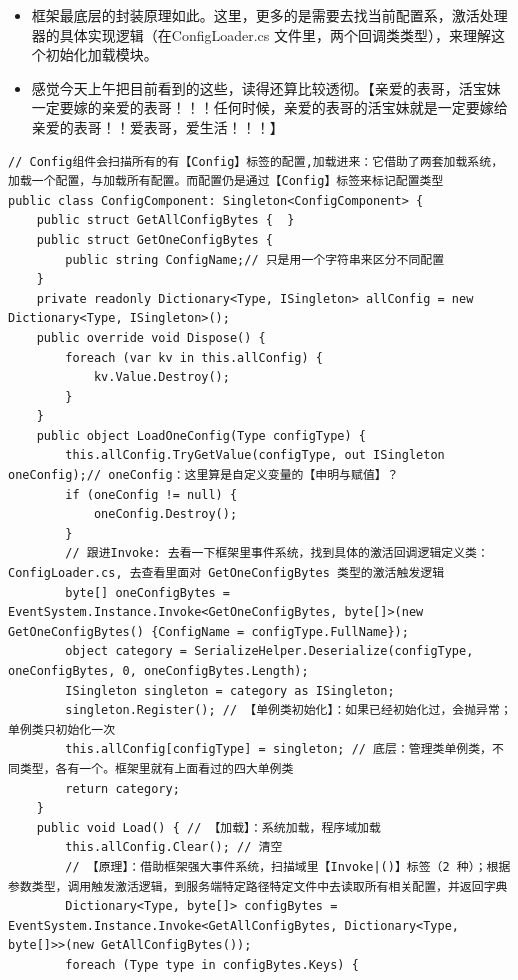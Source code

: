 \documentclass[9pt, b5paper]{article}
\begin{document}
\begin{itemize}
\item 框架最底层的封装原理如此。这里，更多的是需要去找当前配置系，激活处理器的具体实现逻辑（在ConfigLoader.cs 文件里，两个回调类类型），来理解这个初始化加载模块。
\item 感觉今天上午把目前看到的这些，读得还算比较透彻。【亲爱的表哥，活宝妹一定要嫁的亲爱的表哥！！！任何时候，亲爱的表哥的活宝妹就是一定要嫁给亲爱的表哥！！爱表哥，爱生活！！！】
\end{itemize}
\begin{verbatim}
// Config组件会扫描所有的有【Config】标签的配置,加载进来：它借助了两套加载系统，加载一个配置，与加载所有配置。而配置仍是通过【Config】标签来标记配置类型
public class ConfigComponent: Singleton<ConfigComponent> {
    public struct GetAllConfigBytes {  }
    public struct GetOneConfigBytes {
        public string ConfigName;// 只是用一个字符串来区分不同配置 
    }
    private readonly Dictionary<Type, ISingleton> allConfig = new Dictionary<Type, ISingleton>();
    public override void Dispose() {
        foreach (var kv in this.allConfig) {
            kv.Value.Destroy();
        }
    }
    public object LoadOneConfig(Type configType) {
        this.allConfig.TryGetValue(configType, out ISingleton oneConfig);// oneConfig：这里算是自定义变量的【申明与赋值】？
        if (oneConfig != null) {
            oneConfig.Destroy();
        } 
        // 跟进Invoke: 去看一下框架里事件系统，找到具体的激活回调逻辑定义类：ConfigLoader.cs, 去查看里面对 GetOneConfigBytes 类型的激活触发逻辑
        byte[] oneConfigBytes = EventSystem.Instance.Invoke<GetOneConfigBytes, byte[]>(new GetOneConfigBytes() {ConfigName = configType.FullName});
        object category = SerializeHelper.Deserialize(configType, oneConfigBytes, 0, oneConfigBytes.Length);
        ISingleton singleton = category as ISingleton;
        singleton.Register(); // 【单例类初始化】：如果已经初始化过，会抛异常；单例类只初始化一次
        this.allConfig[configType] = singleton; // 底层：管理类单例类，不同类型，各有一个。框架里就有上面看过的四大单例类
        return category;
    }
    public void Load() { // 【加载】：系统加载，程序域加载 
        this.allConfig.Clear(); // 清空
        // 【原理】：借助框架强大事件系统，扫描域里【Invoke|()】标签（2 种）；根据参数类型，调用触发激活逻辑，到服务端特定路径特定文件中去读取所有相关配置，并返回字典
        Dictionary<Type, byte[]> configBytes = EventSystem.Instance.Invoke<GetAllConfigBytes, Dictionary<Type, byte[]>>(new GetAllConfigBytes());
        foreach (Type type in configBytes.Keys) {

\end{verbatim}
\end{document}
